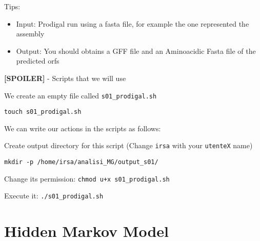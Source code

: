 \documentclass[
]{book}
\newenvironment{Shaded}{\begin{snugshade}}{\end{snugshade}}
\newcommand{\AttributeTok}[1]{\textcolor[rgb]{0.13,0.29,0.53}{#1}}
\newcommand{\CommentTok}[1]{\textcolor[rgb]{0.56,0.35,0.01}{\textit{#1}}}
\newcommand{\DataTypeTok}[1]{\textcolor[rgb]{0.13,0.29,0.53}{#1}}
\newcommand{\ExtensionTok}[1]{#1}
\newcommand{\FunctionTok}[1]{\textcolor[rgb]{0.13,0.29,0.53}{\textbf{#1}}}
\newcommand{\NormalTok}[1]{#1}
\newcommand{\OperatorTok}[1]{\textcolor[rgb]{0.81,0.36,0.00}{\textbf{#1}}}
\newcommand{\StringTok}[1]{\textcolor[rgb]{0.31,0.60,0.02}{#1}}
\newcommand{\VariableTok}[1]{\textcolor[rgb]{0.00,0.00,0.00}{#1}}
\providecommand{\tightlist}{%
  \setlength{\itemsep}{0pt}\setlength{\parskip}{0pt}}
\begin{document}
Tips:

\begin{itemize}
\tightlist
\item
  Input: Prodigal run using a fasta file, for example the one represented the assembly
\item
  Output: You should obtains a GFF file and an Aminoacidic Fasta file of the predicted orfs
\end{itemize}

\textbf{{[}SPOILER{]}} - Scripts that we will use

We create an empty file called \texttt{s01\_prodigal.sh}

\texttt{touch\ s01\_prodigal.sh}

We can write our actions in the scripts as follows:

\begin{Shaded}
\end{Shaded}

Create output directory for this script (Change \texttt{irsa} with your \texttt{utenteX} name)

\begin{verbatim}
mkdir -p /home/irsa/analisi_MG/output_s01/
\end{verbatim}

Change its permission:
\texttt{chmod\ u+x\ s01\_prodigal.sh}

Execute it:
\texttt{./s01\_prodigal.sh}

\section{Hidden Markov Model}\label{hidden-markov-model}
\end{document}
